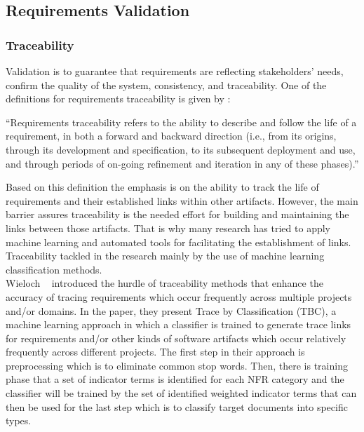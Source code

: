 \subsection{Requirements Validation}

\subsubsection{Traceability}

Validation is to guarantee that requirements are reflecting stakeholders' needs,
confirm the quality of the system, consistency, and traceability.
 One of the definitions for requirements traceability is given by
 \cite{Gotel:1994}:
\begin{displayquote} 
“Requirements traceability refers to the ability to describe and follow the life
of a requirement, in both a forward and backward direction (i.e., from its
origins, through its development and specification, to its subsequent deployment
and use, and through periods of on-going refinement and iteration in any of
these phases).”
\end{displayquote}
Based on this definition the emphasis is on the ability to track the life of
requirements and their established links within other artifacts. However, the
main barrier assures traceability is the needed effort for building and
maintaining the links between those artifacts. That is why many research has
tried to apply machine learning and automated tools for facilitating the
establishment of links\cite{Gervasi:2011}.
Traceability tackled in the research mainly by the use of machine learning
classification methods.\\

Wieloch \etal~\cite{Wieloch:2013} introduced the hurdle of traceability methods
that enhance the accuracy of tracing requirements which occur frequently across
multiple projects and/or domains. In the paper, they present Trace by 
Classification (TBC),  a machine learning approach in which a classifier is
trained to generate trace links for
requirements and/or other kinds of software artifacts which occur relatively frequently across different projects. The first
step in their approach is preprocessing which is to eliminate common stop words.
Then, there is training phase that a set of indicator terms is identified for
each NFR category and the classifier will be trained by the set of identified
weighted indicator terms that can then be used for the last step which is to
classify target documents into specific types.\newline

